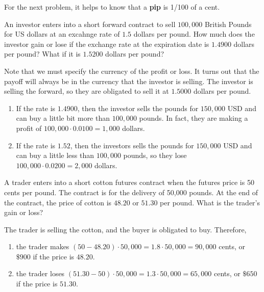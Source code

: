 \documentclass{article}
\begin{document}
  \begin{definition}[Pips]
    For the next problem, it helps to know that a \textbf{pip} is 1/100 of a cent. 
  \end{definition}

  \begin{exercise}[Hull 1.5]
    An investor enters into a short forward contract to sell $100,000$ British Pounds for US dollars at an excahnge rate of $1.5$ dollars per pound. How much does the investor gain or lose if the exchange rate at the expiration date is $1.4900$ dollars per pound? What if it is $1.5200$ dollars per pound? 
  \end{exercise}
  \begin{solution}
    Note that we must specify the currency of the profit or loss. It turns out that the payoff will always be in the currency that the investor is selling. The investor is selling the forward, so they are obligated to sell it at $1.5000$ dollars per pound. 
    \begin{enumerate}
      \item If the rate is $1.4900$, then the investor sells the pounds for $150,000$ USD and can buy a little bit more than $100,000$ pounds. In fact, they are making a profit of $100,000 \cdot 0.0100 = 1,000$ dollars.
      \item If the rate is $1.52$, then the investors sells the pounds for $150,000$ USD and can buy a little less than $100,000$ pounds, so they lose $100,000 \cdot 0.0200 = 2,000$ dollars. 
    \end{enumerate}
  \end{solution}


  \begin{exercise}[Hull 1.6]
    A trader enters into a short cotton futures contract when the futures price is 50 cents per pound. The contract is for the delivery of 50,000 pounds. At the end of the contract, the price of cotton is $48.20$ or $51.30$ per pound. What is the trader's gain or loss?
  \end{exercise}
  \begin{solution}
    The trader is selling the cotton, and the buyer is obligated to buy. Therefore, 
    \begin{enumerate}
      \item the trader makes $(50 - 48.20) \cdot 50,000 = 1.8 \cdot 50,000 = 90,000$ cents, or $\$900$ if the price is $48.20$. 
      \item the trader loses $(51.30 - 50) \cdot 50,000 = 1.3 \cdot 50,000 = 65,000$ cents, or $\$650$ if the price is $51.30$.
    \end{enumerate}
  \end{solution}
\end{document}
